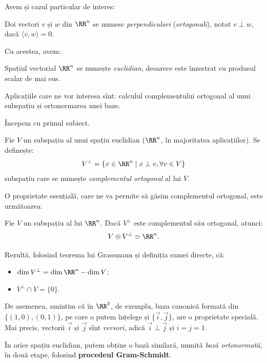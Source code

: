 Avem și cazul particular de interes:
\begin{definition}\label{def:perp}
  Doi vectori $ v $ și $ w $ din $ \RR^n $ se numesc \emph{perpendiculari}
  (\emph{ortogonali}), notat $ v \perp w $, dacă $ \langle v, w \rangle = 0 $.
\end{definition}

Cu acestea, avem:
\begin{definition}\label{def:sp-eucl}
  Spațiul vectorial $ \RR^n $ se numește \emph{euclidian}, deoarece este
  înzestrat cu produsul scalar de mai sus.
\end{definition}

Aplicațiile care ne vor interesa sînt: calculul complementului
ortogonal al unui subspațiu și ortonormarea unei baze.

Începem cu primul subiect.

\begin{definition}\label{def:compl-ort}
  Fie $ V $ un subspațiu al unui spațiu euclidian ($ \RR^n $, în majoritatea
  aplicațiilor). Se definește:
  \[
    V^\perp = \{ x \in \RR^n \mid x \perp v, \forall v \in V \}
  \]
  subspațiu care se numește \emph{complementul ortogonal} al lui $ V $.
\end{definition}

O proprietate esențială, care ne va permite să găsim complementul ortogonal, este
următoarea:
\begin{theorem}\label{thm:compl-ort}
  Fie $ V $ un subspațiu al lui $ \RR^n $. Dacă $ V^\perp $ este complementul
  său ortogonal, atunci:
  \[
    V \oplus V^\perp \simeq \RR^n.
  \]
\end{theorem}

Rezultă, folosind teorema lui Grassmann și definiția sumei directe, că:
\begin{itemize}
\item $ \dim V^\perp = \dim \RR^n - \dim V $;
\item $ V^\perp \cap V = \{ 0 \} $.
\end{itemize}

De asemenea, amintim că în $ \RR^2 $, de exemplu, baza canonică formată
din $ \{(1, 0), (0, 1)\} $, pe care o putem înțelege și $ \{ \vec{i}, \vec{j} \} $,
are o proprietate specială. Mai precis, vectorii $ \vec{i} $ și $ \vec{j} $
sînt \emph{versori}, adică $ \vec{i} \perp \vec{j} $ și $ i = j = 1 $.

În orice spațiu euclidian, putem obține o bază similară, numită \emph{bază %
  ortonormată}, în două etape, folosind \textbf{procedeul Gram-Schmidt}.


